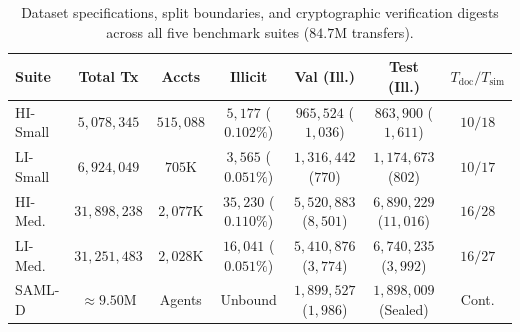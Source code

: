 \documentclass[sigconf,nonacm]{acmart}
\begin{document}
\begin{table}[t]
\centering
\caption{Dataset specifications, split boundaries, and cryptographic verification digests across all five benchmark suites ($84.7\text{M}$ transfers).}
\label{tab:dataset_specifications}
\scriptsize
\setlength{\tabcolsep}{1.2pt}
\begin{tabular}{lcccccc}
\toprule
\textbf{Suite} & \textbf{Total Tx} & \textbf{Accts} & \textbf{Illicit} & \textbf{Val (Ill.)} & \textbf{Test (Ill.)} & \textbf{$T_{\text{doc}}/T_{\text{sim}}$} \\
\midrule
HI-Small & $5{,}078{,}345$ & $515{,}088$ & $5{,}177$ ($0.102\%$) & $965{,}524$ ($1{,}036$) & $863{,}900$ ($1{,}611$) & $10 / 18$ \\
LI-Small & $6{,}924{,}049$ & $705\text{K}$ & $3{,}565$ ($0.051\%$) & $1{,}316{,}442$ ($770$) & $1{,}174{,}673$ ($802$) & $10 / 17$ \\
HI-Med. & $31{,}898{,}238$ & $2{,}077\text{K}$ & $35{,}230$ ($0.110\%$) & $5{,}520{,}883$ ($8{,}501$) & $6{,}890{,}229$ ($11{,}016$) & $16 / 28$ \\
LI-Med. & $31{,}251{,}483$ & $2{,}028\text{K}$ & $16{,}041$ ($0.051\%$) & $5{,}410{,}876$ ($3{,}774$) & $6{,}740{,}235$ ($3{,}992$) & $16 / 27$ \\
SAML-D & $\approx 9.50\text{M}$ & Agents & Unbound & $1{,}899{,}527$ ($1{,}986$) & $1{,}898{,}009$ (Sealed) & Cont. \\
\bottomrule
\end{tabular}
\end{table}
\end{document}
